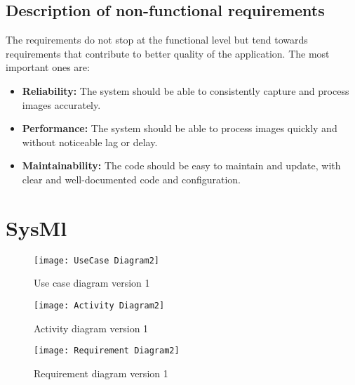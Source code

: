 \subsection{Description of non-functional requirements}
The requirements do not stop at the functional level but tend towards requirements that contribute to better quality of the application. The most important ones are:
\begin{itemize}
\item \textbf{Reliability:} The system should be able to consistently capture and process images accurately.
\item \textbf{Performance:} The system should be able to process images quickly and without noticeable lag or delay.
\item \textbf{Maintainability:} The code should be easy to maintain and update, with clear and well-documented code and configuration.
\end{itemize}

\section{SysMl}

\FloatBarrier
\begin{figure}[h]

         \centering
        \texttt{[image: UseCase Diagram2]}
   
        \caption{Use case diagram version 1}
        \label{Use case diagram version 1}

    \end{figure}


\FloatBarrier

\begin{figure}[h]

         \centering
        \texttt{[image: Activity Diagram2]}
   
        \caption{Activity diagram version 1}
        \label{Activity diagram version 1}

    \end{figure}


\FloatBarrier


\begin{figure}[h]

         \centering
        \texttt{[image: Requirement Diagram2]}
   
        \caption{Requirement diagram version 1}
        \label{Requirement diagram version 1}

    \end{figure}




